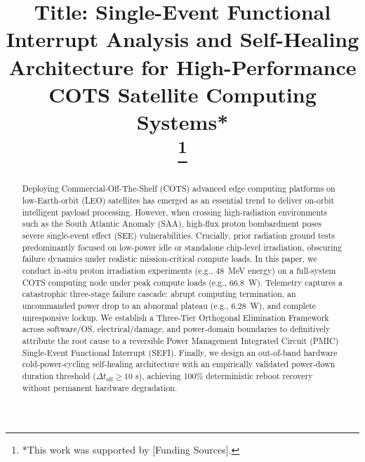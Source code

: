\documentclass[conference]{IEEEtran}
\begin{document}
\title{Title: Single-Event Functional Interrupt Analysis and Self-Healing Architecture for High-Performance COTS Satellite Computing Systems*\\
\thanks{*This work was supported by [Funding Sources].}
}

\author{
}

\maketitle

\begin{abstract}
Deploying Commercial-Off-The-Shelf (COTS) advanced edge computing platforms on low-Earth-orbit (LEO) satellites has emerged as an essential trend to deliver on-orbit intelligent payload processing. However, when crossing high-radiation environments such as the South Atlantic Anomaly (SAA), high-flux proton bombardment poses severe single-event effect (SEE) vulnerabilities. Crucially, prior radiation ground tests predominantly focused on low-power idle or standalone chip-level irradiation, obscuring failure dynamics under realistic mission-critical compute loads. In this paper, we conduct in-situ proton irradiation experiments (e.g., 48~MeV energy) on a full-system COTS computing node under peak compute loads (e.g., 66.8~W). Telemetry captures a catastrophic three-stage failure cascade: abrupt computing termination, an uncommanded power drop to an abnormal plateau (e.g., 6.28~W), and complete unresponsive lockup. We establish a Three-Tier Orthogonal Elimination Framework across software/OS, electrical/damage, and power-domain boundaries to definitively attribute the root cause to a reversible Power Management Integrated Circuit (PMIC) Single-Event Functional Interrupt (SEFI). Finally, we design an out-of-band hardware cold-power-cycling self-healing architecture with an empirically validated power-down duration threshold ($\Delta t_{\text{off}} \ge 10\text{ s}$), achieving 100\% deterministic reboot recovery without permanent hardware degradation.
\end{abstract}
\end{document}
